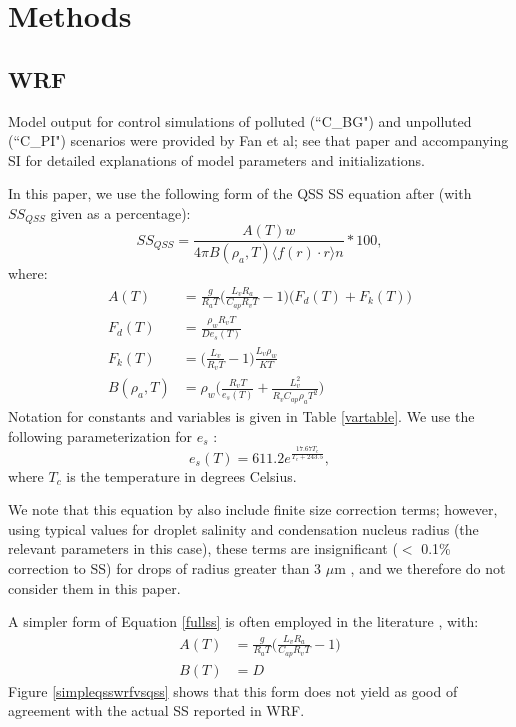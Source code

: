 \documentclass{article}
\begin{document}
\clearpage
\newpage

\section{Methods}

\subsection{WRF}

Model output for control simulations of polluted (``C\_BG") and unpolluted (``C\_PI") scenarios were provided by Fan et al; see that paper and accompanying SI for detailed explanations of model parameters and initializations.

In this paper, we use the following form of the QSS SS equation after \cite{Rogers1989} (with $SS_{QSS}$ given as a percentage):
\begin{equation}
\label{fullss}
SS_{QSS} = \frac{A(T) w}{4\pi B(\rho_a, T) \langle f(r)\cdot r\rangle n}*100,
\end{equation}
where:
\begin{align}
A(T) &= \frac{g}{R_a T}\Big(\frac{L_v R_a}{C_{ap} R_v T} - 1\Big)\big(F_d(T) + F_k(T)\big)\nonumber\\
F_d(T) &= \frac{\rho_w R_v T}{D e_s(T)}\nonumber\\
F_k(T) &= \Big(\frac{L_v}{R_v T} - 1\Big)\frac{L_v \rho_w}{K T}\nonumber\\
B(\rho_a, T) &= \rho_w\Big(\frac{R_v T}{e_s(T)} + \frac{L_v^2}{R_v C_{ap} \rho_a T^2}\Big)
\end{align}
Notation for constants and variables is given in Table \ref{vartable}. We use the following parameterization for $e_s$ \cite{Rogers1989}:
\begin{equation}
e_s(T) = 611.2e^{\frac{17.67T_c}{T_c + 243.5}},
\end{equation}
where $T_c$ is the temperature in degrees Celsius.

We note that this equation by also include finite size correction terms; however, using typical values for droplet salinity and condensation nucleus radius (the relevant parameters in this case), these terms are insignificant ($<$ 0.1\% correction to SS) for drops of radius greater than 3 $\mu$m \cite{Rogers1989}, and we therefore do not consider them in this paper.

A simpler form of Equation \ref{fullss} is often employed in the literature \cite{Grabowski2020, Rogers1989}, with:
\begin{align}
A(T) &= \frac{g}{R_a T}\Big(\frac{L_v R_a}{C_{ap} R_v T} - 1\Big)\nonumber\\
B(T) &= D
\end{align}
Figure \ref{simpleqsswrfvsqss} shows that this form does not yield as good of agreement with the actual SS reported in WRF.
\end{document}
